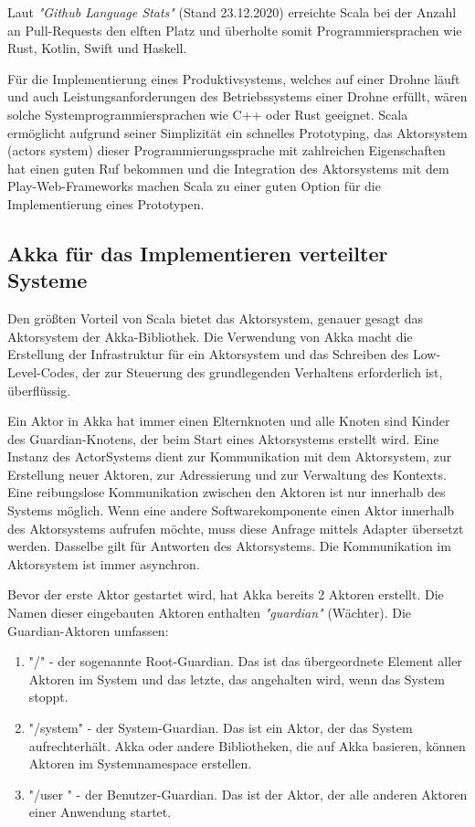Laut \textit{"Github Language Stats"} (Stand 23.12.2020) erreichte Scala bei der Anzahl an Pull-Requests den elften Platz und überholte somit Programmiersprachen wie Rust, Kotlin, Swift und Haskell.

Für die Implementierung eines Produktivsystems, welches auf einer Drohne läuft und auch Leistungsanforderungen des Betriebssystems einer Drohne erfüllt, wären solche Systemprogrammiersprachen wie C++ oder Rust geeignet. Scala ermöglicht aufgrund seiner Simplizität ein schnelles Prototyping, das Aktorsystem (actors system) dieser Programmierungssprache mit zahlreichen Eigenschaften hat einen guten Ruf bekommen und die Integration des Aktorsystems mit dem Play-Web-Frameworks machen Scala zu einer guten Option für die Implementierung eines Prototypen.

\subsection{Akka für das Implementieren verteilter Systeme}

Den größten Vorteil von Scala bietet das Aktorsystem, genauer gesagt das Aktorsystem der Akka-Bibliothek. Die Verwendung von Akka macht die Erstellung der Infrastruktur für ein Aktorsystem und das Schreiben des Low-Level-Codes, der zur Steuerung des grundlegenden Verhaltens erforderlich ist, überflüssig.

Ein Aktor in Akka hat immer einen Elternknoten und alle Knoten sind Kinder des Guardian-Knotens, der beim Start eines Aktorsystems erstellt wird. Eine Instanz des ActorSystems dient zur Kommunikation mit dem Aktorsystem, zur Erstellung neuer Aktoren, zur Adressierung und zur Verwaltung des Kontexts. Eine reibungslose Kommunikation zwischen den Aktoren ist nur innerhalb des Systems möglich. Wenn eine andere Softwarekomponente einen Aktor innerhalb des Aktorsystems aufrufen möchte, muss diese Anfrage mittels Adapter übersetzt werden. Dasselbe gilt für Antworten des Aktorsystems. Die Kommunikation im Aktorsystem ist immer asynchron.

Bevor der erste Aktor gestartet wird, hat Akka bereits 2 Aktoren erstellt. Die Namen dieser eingebauten Aktoren enthalten \textit{"guardian"} (Wächter). Die Guardian-Aktoren umfassen:

\begin{enumerate}
	\item "/" - der sogenannte Root-Guardian. Das ist das übergeordnete Element aller Aktoren im System und das letzte, das angehalten wird, wenn das System stoppt.
	
	\item "/system" - der System-Guardian. Das ist ein Aktor, der das System aufrechterhält. Akka oder andere Bibliotheken, die auf Akka basieren, können Aktoren im Systemnamespace erstellen.
	
	\item "/user " - der Benutzer-Guardian. Das ist der Aktor, der alle anderen Aktoren einer Anwendung startet.
\end{enumerate}


